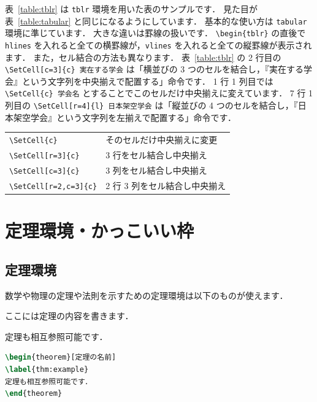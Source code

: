 \documentclass[
    paper=a4paper,      %
    article,            %
    fontsize=11pt,      %
    jafontsize=11pt,    %
    head_space=25mm,    %
    foot_space=25mm,    %
    gutter=20mm,        %
    fore-edge=20mm      %
    ]{jlreq}            %
\begin{document}
表~\ref{table:tblr} は \verb|tblr| 環境を用いた表のサンプルです．
見た目が表~\ref{table:tabular} と同じになるようにしています．
基本的な使い方は \verb|tabular| 環境に準じています．
大きな違いは罫線の扱いです．
\verb|\begin{tblr}| の直後で \verb|hlines| を入れると全ての横罫線が，\verb|vlines| を入れると全ての縦罫線が表示されます．
また，セル結合の方法も異なります．
表~\ref{table:tblr} の 2 行目の \verb|\SetCell[c=3]{c} 実在する学会| は「横並びの 3 つのセルを結合し，『実在する学会』という文字列を中央揃えで配置する」命令です．
1 行 1 列目では \verb|\SetCell{c} 学会名| とすることでこのセルだけ中央揃えに変えています．
7 行 1 列目の \verb|\SetCell[r=4]{l} 日本架空学会| は「縦並びの 4 つのセルを結合し，『日本架空学会』という文字列を左揃えで配置する」命令です．

\begin{tcolorbox}[title={\texttt{tblr} 環境でセル結合する際に使用するコマンド}]
    \begin{tabular}{ll}
        \verb|\SetCell{c}|   & そのセルだけ中央揃えに変更 \\
        \verb|\SetCell[r=3]{c}|  & 3 行をセル結合し中央揃え \\
        \verb|\SetCell[c=3]{c}|  & 3 列をセル結合し中央揃え \\
        \verb|\SetCell[r=2,c=3]{c}|  & 2 行 3 列をセル結合し中央揃え \\
    \end{tabular}
\end{tcolorbox}

\section{定理環境・かっこいい枠}
\label{sec:theorem-box}

\subsection{定理環境}
\label{ssec:theorem}

数学や物理の定理や法則を示すための定理環境は以下のものが使えます．

\begin{theorem}
ここには定理の内容を書きます．
\end{theorem}

\begin{theorem}[定理の名前]
\label{thm:example}
定理も相互参照可能です．
\end{theorem}
\begin{lstlisting}[language=TeX]
\begin{theorem}[定理の名前]
\label{thm:example}
定理も相互参照可能です．
\end{theorem}
\end{lstlisting}
\end{document}
